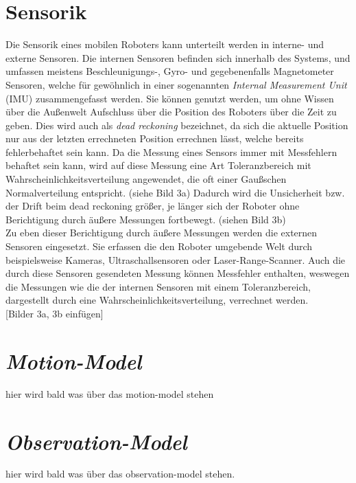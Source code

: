 \section{Sensorik}\label{sec:Sensorik}
Die Sensorik eines mobilen Roboters kann unterteilt werden in interne- und externe Sensoren. Die internen Sensoren befinden sich innerhalb des Systems, und umfassen meistens Beschleunigungs-, Gyro- und gegebenenfalls Magnetometer Sensoren, welche für gewöhnlich in einer sogenannten \textit{Internal Measurement Unit} (IMU) zusammengefasst werden. Sie können genutzt werden, um ohne Wissen über die Außenwelt Aufschluss über die Position des Roboters über die Zeit zu geben. Dies wird auch als \textit{dead reckoning} bezeichnet, da sich die aktuelle Position nur aus der letzten errechneten Position errechnen lässt, welche bereits fehlerbehaftet sein kann. Da die Messung eines Sensors immer mit Messfehlern behaftet sein kann, wird auf diese Messung eine Art Toleranzbereich mit Wahrscheinlichkeitsverteilung angewendet, die oft einer Gaußschen Normalverteilung entspricht. (siehe Bild 3a) Dadurch wird die Unsicherheit bzw. der Drift beim dead reckoning größer, je länger sich der Roboter ohne Berichtigung durch äußere Messungen fortbewegt. (siehen Bild 3b)\\
Zu eben dieser Berichtigung durch äußere Messungen werden die externen Sensoren eingesetzt. Sie erfassen die den Roboter umgebende Welt durch beispielsweise Kameras, Ultraschallsensoren oder Laser-Range-Scanner. Auch die durch diese Sensoren gesendeten Messung können Messfehler enthalten, weswegen die Messungen wie die der internen Sensoren mit einem Toleranzbereich, dargestellt durch eine Wahrscheinlichkeitsverteilung, verrechnet werden.\\

[Bilder 3a, 3b einfügen]

\section{\textit{Motion-Model}}\label{sec:Motion-Model}
hier wird bald was über das motion-model stehen

\section{\textit{Observation-Model}}\label{sec:Observation-Model}
hier wird bald was über das observation-model stehen.



